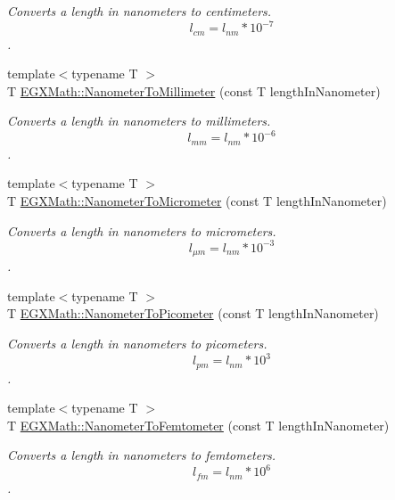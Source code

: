 \begin{DoxyCompactItemize}
\begin{DoxyCompactList}\small\item\em Converts a length in nanometers to centimeters. \[ l_{cm}=l_{nm} * 10^{-7} \]. \end{DoxyCompactList}\item 
{\footnotesize template$<$typename T $>$ }\\T \mbox{\hyperlink{group___e_g_x_math-_conversions-_length_conversions-_s_i-_nanometer-_s_i_gac8b870837f9a0213c8383079437e8cc6}{E\+G\+X\+Math\+::\+Nanometer\+To\+Millimeter}} (const T length\+In\+Nanometer)
\begin{DoxyCompactList}\small\item\em Converts a length in nanometers to millimeters. \[ l_{mm}=l_{nm} * 10^{-6} \]. \end{DoxyCompactList}\item 
{\footnotesize template$<$typename T $>$ }\\T \mbox{\hyperlink{group___e_g_x_math-_conversions-_length_conversions-_s_i-_nanometer-_s_i_gaa539df5d709bface86429c8a25d7f6e1}{E\+G\+X\+Math\+::\+Nanometer\+To\+Micrometer}} (const T length\+In\+Nanometer)
\begin{DoxyCompactList}\small\item\em Converts a length in nanometers to micrometers. \[ l_{\mu m}=l_{nm} * 10^{-3} \]. \end{DoxyCompactList}\item 
{\footnotesize template$<$typename T $>$ }\\T \mbox{\hyperlink{group___e_g_x_math-_conversions-_length_conversions-_s_i-_nanometer-_s_i_gaba1e9bf91f6e065f8ba8be8dd039b499}{E\+G\+X\+Math\+::\+Nanometer\+To\+Picometer}} (const T length\+In\+Nanometer)
\begin{DoxyCompactList}\small\item\em Converts a length in nanometers to picometers. \[ l_{pm}=l_{nm} * 10^{3} \]. \end{DoxyCompactList}\item 
{\footnotesize template$<$typename T $>$ }\\T \mbox{\hyperlink{group___e_g_x_math-_conversions-_length_conversions-_s_i-_nanometer-_s_i_ga35ac002514f0d8cda8b1fe100b21f54b}{E\+G\+X\+Math\+::\+Nanometer\+To\+Femtometer}} (const T length\+In\+Nanometer)
\begin{DoxyCompactList}\small\item\em Converts a length in nanometers to femtometers. \[ l_{fm}=l_{nm} * 10^{6} \]. \end{DoxyCompactList}\item 

\end{DoxyCompactItemize}
